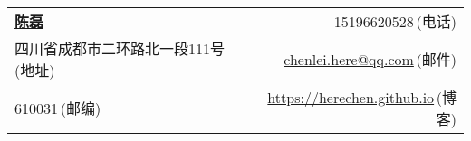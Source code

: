 \newcommand{\myheader}{
\begin{tabular*}{\textwidth}{l@{\extracolsep{\fill}}r}
  \textbf{\href{https://herechen.github.io}{\LARGE 陈磊}} & 15196620528$\,${\color{labelgrey}(电话)} \\
  四川省成都市二环路北一段111号$\,${\color{labelgrey}(地址)} & \href{mailto:chenlei.here@qq.com}{chenlei.here@qq.com}$\,${\color{labelgrey}(邮件)} \\
  610031$\,${\color{labelgrey}(邮编)} & \href{https://herechen.github.io}{https://herechen.github.io}$\,${\color{labelgrey}(博客)} \\
  \end{tabular*}\\\vspace{0.1in}}

\myheader